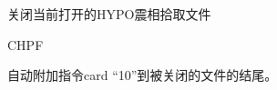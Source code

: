 \label{cmd:chpf}

关闭当前打开的HYPO震相拾取文件

\begin{SACSTX}
CHPF
\end{SACSTX}

自动附加指令card ``10''到被关闭的文件的结尾。
